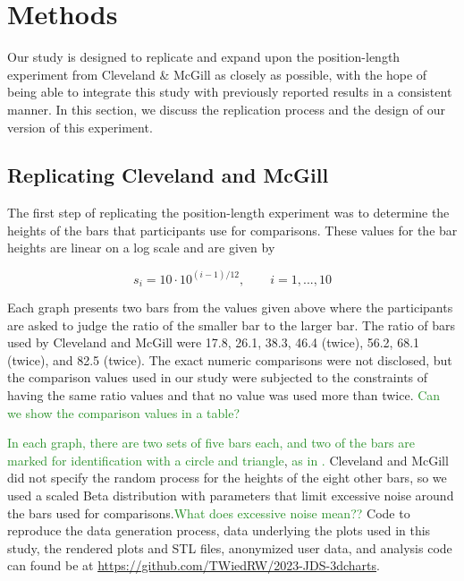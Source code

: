 \documentclass[letterpaper,inpress,dvipsnames]{jdsart}
\begin{document}
\hypertarget{methods}{%
\section{Methods}\label{methods}}

Our study is designed to replicate and expand upon the position-length experiment from Cleveland \& McGill as closely as possible, with the hope of being able to integrate this study with previously reported results in a consistent manner.
In this section, we discuss the replication process and the design of our version of this experiment.

\hypertarget{replicating-cleveland-and-mcgill}{%
\subsection{Replicating Cleveland and McGill}\label{replicating-cleveland-and-mcgill}}

The first step of replicating the position-length experiment was to determine the heights of the bars that participants use for comparisons.
These values for the bar heights are linear on a log scale and are given by

\[s_i=10\cdot 10^{(i-1)/12}, \qquad i=1,...,10\]

Each graph presents two bars from the values given above where the participants are asked to judge the ratio of the smaller bar to the larger bar. The ratio of bars used by Cleveland and McGill were 17.8, 26.1, 38.3, 46.4 (twice), 56.2, 68.1 (twice), and 82.5 (twice).
The exact numeric comparisons were not disclosed, but the comparison values used in our study were subjected to the constraints of having the same ratio values and that no value was used more than twice. {\textcolor{ForestGreen}{Can we show the comparison values in a table?}}

{\textcolor{ForestGreen}{In each graph, there are two sets of five bars each, and two of the bars are marked for identification with a circle and triangle}}, {\textcolor{ForestGreen}{as in .}}
Cleveland and McGill did not specify the random process for the heights of the eight other bars, so we used a scaled Beta distribution with parameters that limit excessive noise around the bars used for comparisons.{\textcolor{ForestGreen}{What does excessive noise mean??}}
Code to reproduce the data generation process, data underlying the plots used in this study, the rendered plots and STL files, anonymized user data, and analysis code can found be at \url{https://github.com/TWiedRW/2023-JDS-3dcharts}.
\end{document}
